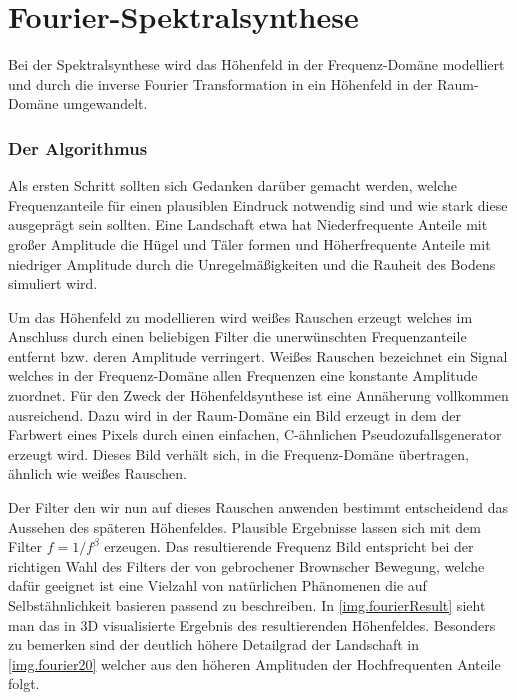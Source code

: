 \chapter{Fourier-Spektralsynthese}
Bei der Spektralsynthese wird das Höhenfeld in der Frequenz-Domäne modelliert und durch die inverse Fourier Transformation in ein Höhenfeld in der Raum-Domäne umgewandelt. 

\subsection{Der Algorithmus}
Als ersten Schritt sollten sich Gedanken darüber gemacht werden, welche Frequenzanteile für einen plausiblen Eindruck notwendig sind und wie stark diese ausgeprägt sein sollten. Eine Landschaft etwa hat Niederfrequente Anteile mit großer Amplitude die Hügel und Täler formen und Höherfrequente Anteile mit niedriger Amplitude durch die Unregelmäßigkeiten und die Rauheit des Bodens simuliert wird.

Um das Höhenfeld zu modellieren wird weißes Rauschen erzeugt welches im Anschluss durch einen beliebigen Filter die unerwünschten Frequenzanteile entfernt bzw. deren Amplitude verringert.
Weißes Rauschen bezeichnet ein Signal welches in der Frequenz-Domäne allen Frequenzen eine konstante Amplitude zuordnet\cite{whiteNoise}. Für den Zweck der Höhenfeldsynthese ist eine Annäherung vollkommen ausreichend. Dazu wird in der Raum-Domäne ein Bild erzeugt in dem der Farbwert eines Pixels durch einen einfachen, C-ähnlichen Pseudozufallsgenerator erzeugt wird\label{fourier.rauschbild}. Dieses Bild verhält sich, in die Frequenz-Domäne übertragen, ähnlich wie weißes Rauschen.

Der Filter den wir nun auf dieses Rauschen anwenden bestimmt entscheidend das Aussehen des späteren Höhenfeldes. Plausible Ergebnisse lassen sich mit dem Filter $f=1/f^\beta$
erzeugen. Das resultierende Frequenz Bild entspricht bei der richtigen Wahl des Filters der von gebrochener Brownscher Bewegung\cite{fbmFromFourier}, welche dafür geeignet ist eine Vielzahl von natürlichen Phänomenen die auf Selbstähnlichkeit basieren passend zu beschreiben\cite{fbm}.
In \autoref{img.fourierResult} sieht man das in 3D visualisierte Ergebnis des resultierenden Höhenfeldes. Besonders zu bemerken sind der deutlich höhere Detailgrad der Landschaft in \autoref{img.fourier20} welcher aus den höheren Amplituden der Hochfrequenten Anteile folgt.

